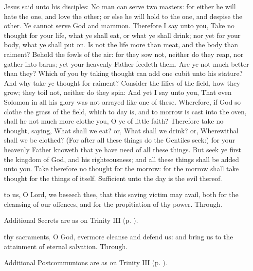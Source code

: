  Jesus said unto his disciples: No man can serve two masters: for either he will hate the one, and love the other; or else he will hold to the one, and despise the other. Ye cannot serve God and mammon. Therefore I say unto you, Take no thought for your life, what ye shall eat, or what ye shall drink; nor yet for your body, what ye shall put on. Is not the life more than meat, and the body than raiment? Behold the fowls of the air: for they sow not, neither do they reap, nor gather into barns; yet your heavenly Father feedeth them. Are ye not much better than they? Which of you by taking thought can add one cubit unto his stature? And why take ye thought for raiment? Consider the lilies of the field, how they grow; they toil not, neither do they spin: And yet I say unto you, That even Solomon in all his glory was not arrayed like one of these. Wherefore, if God so clothe the grass of the field, which to day is, and to morrow is cast into the oven, shall he not much more clothe you, O ye of little faith? Therefore take no thought, saying, What shall we eat? or, What shall we drink? or, Wherewithal shall we be clothed? (For after all these things do the Gentiles seek:) for your heavenly Father knoweth that ye have need of all these things. But seek ye first the kingdom of God, and his righteousness; and all these things shall be added unto you. Take therefore no thought for the morrow: for the morrow shall take thought for the things of itself. Sufficient unto the day is the evil thereof.


\secret
{} to us, O Lord, we beseech thee, that this saving victim may avail, both for the cleansing of our offences, and for the propitiation of thy power. Through.
\begin{rubric}
    Additional Secrets are as on Trinity III (p. \pageref{TrinityIII}).
\end{rubric}


\postcommunion
{} thy sacraments, O God, evermore cleanse and defend us: and bring us to the attainment of eternal salvation. Through.
\begin{rubric}
    Additional Postcommunions are as on Trinity III (p. \pageref{TrinityIII}).
\end{rubric}

